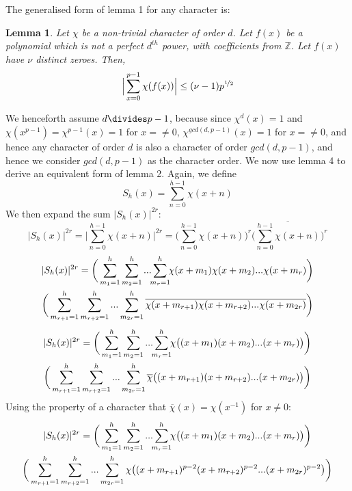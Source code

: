 \documentclass{report}
\newtheorem{lemma}{Lemma}
\begin{document}
The generalised form of lemma 1 for any character is:
\begin{lemma}
\cite{schmidt}Let $\chi$ be a non-trivial character of order $d$. Let $f(x)$ be a polynomial which is not a perfect $d^{th}$ power, with coefficients from $\mathbb{Z}$. Let $f(x)$ have $\nu$ distinct zeroes. Then,
$$\Big\lvert\sum\limits_{x=0}^{p-1}\chi(f(x))\Big\rvert\leq (\nu -1)p^{\nicefrac{1}{2}}$$
\end{lemma}
We henceforth assume $d \divides p-1$, because since $\chi^{d}(x)=1$ and $\chi(x^{p-1})=\chi^{p-1}(x)=1$ for $x=\neq0$, $\chi^{gcd(d,p-1)}(x)=1$ for $x=\neq0$, and hence any character of order $d$ is also a character of order $gcd(d,p-1)$, and hence we consider $gcd(d,p-1)$ as the character order.
We now use lemma 4 to derive an equivalent form of lemma 2. Again, we define
$$S_h(x)=\sum\limits_{n=0}^{h-1}\chi(x+n)$$
We then expand the sum $\lvert S_h(x)\rvert^{2r}$:
$$\lvert S_h(x)\rvert^{2r}= \Big\lvert\sum\limits_{n=0}^{h-1}\chi(x+n)\Big\rvert^{2r}= \Big(\sum\limits_{n=0}^{h-1}\chi(x+n)\Big)^r\Big(\overline{\sum\limits_{n=0}^{h-1}\chi(x+n)}\Big)^r$$
\begin{multline*}
\lvert S_h(x)\rvert^{2r} =\bigg(\sum\limits_{m_1=1}^h\sum\limits_{m_2=1}^h...\sum\limits_{\mathclap{m_{r}=1}}^h \chi(x+m_1)\chi(x+m_2)...\chi(x+m_{r})\bigg)
\\
\bigg(\sum\limits_{m_{r+1}=1}^h\sum\limits_{m_{r+2}=1}^h...\sum\limits_{m_{2r}=1}^h \overline{\chi(x+m_{r+1})\chi(x+m_{r+2})...\chi(x+m_{2r})}\bigg)
\end{multline*}
\begin{multline*}
\lvert S_h(x)\rvert^{2r} =\bigg(\sum\limits_{m_1=1}^h\sum\limits_{m_2=1}^h...\sum\limits_{\mathclap{m_{r}=1}}^h \chi\big((x+m_1)(x+m_2)...(x+m_{r})\big)\bigg)
\\
\bigg(\sum\limits_{m_{r+1}=1}^h\sum\limits_{m_{r+2}=1}^h...\sum\limits_{m_{2r}=1}^h \overline{\chi}\big((x+m_{r+1})(x+m_{r+2})...(x+m_{2r})\big)\bigg)
\end{multline*}
Using the property of a character that $\overline{\chi}(x)=\chi (x^{-1})$ for $x\neq0$:
\begin{multline*}
\lvert S_h(x)\rvert^{2r} =\bigg(\sum\limits_{m_1=1}^h\sum\limits_{m_2=1}^h...\sum\limits_{\mathclap{m_{r}=1}}^h \chi\big((x+m_1)(x+m_2)...(x+m_{r})\big)\bigg)
\\
\bigg(\sum\limits_{m_{r+1}=1}^h\sum\limits_{m_{r+2}=1}^h...\sum\limits_{m_{2r}=1}^h \chi\big((x+m_{r+1})^{p-2}(x+m_{r+2})^{p-2}...(x+m_{2r})^{p-2}\big)\bigg)
\end{multline*}
\end{document}
